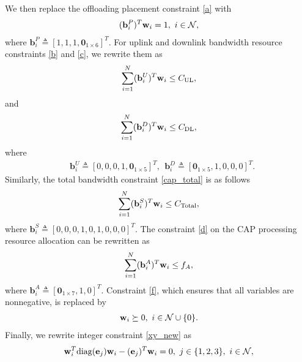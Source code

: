 \documentclass[10pt,journal,compsoc]{IEEEtran}
\begin{document}
We then replace the offloading placement constraint \eqref{a} with
\begin{align}
({\mathbf{b}^P_{i}})^T\mathbf{w}_i= 1,\
i\in\mathcal{N},\label{problem_QCQP.c}\allowdisplaybreaks
\end{align}
where $ \mathbf{b}^P_i\triangleq[1,1,1, \mathbf{0}_{1\times 6}]^T. $
For uplink and downlink bandwidth resource constraints \eqref{b} and
\eqref{c}, we rewrite them as
\begin{align}
\sum_{i=1}^N({\mathbf{b}^U_{i}})^T\mathbf{w}_i\leq
C_{\mathrm{UL}},\label{problem_QCQP.d}\allowdisplaybreaks
\end{align}
and
\begin{align}
\sum_{i=1}^N({\mathbf{b}^D_{i}})^T\mathbf{w}_i\leq
C_{\mathrm{DL}},\label{problem_QCQP.e}\allowdisplaybreaks
\end{align}
where
\begin{align}
&\mathbf{b}^{U}_i\triangleq[0,0,0,1, \mathbf{0}_{1\times
5}]^T,\ \ \mathbf{b}^{D}_i\triangleq[\mathbf{0}_{1\times
5},1,0,0,0]^T.\nonumber
\end{align}
Similarly, the total bandwidth constraint \eqref{cap_total} is as
follows
\begin{align}
\sum_{i=1}^N({\mathbf{b}^{S}_{i}})^T\mathbf{w}_i\leq
C_{\mathrm{Total}},\label{problem_QCQP.total}\allowdisplaybreaks
\end{align}
where
$\mathbf{b}^{S}_i\triangleq[0,0,0,1,0,1,0,0,0]^T.$
The constraint \eqref{d} on the CAP processing resource allocation
can be rewritten as
\begin{align}
\sum_{i=1}^N({\mathbf{b}^A_{i}})^T\mathbf{w}_i\leq
f_A,\label{problem_QCQP.f}\allowdisplaybreaks
\end{align}
where $ \mathbf{b}^{A}_i\triangleq[\mathbf{0}_{1\times 7},1,0]^T. $
Constraint \eqref{f}, which ensures that all variables are
nonnegative, is replaced by
\begin{align}
\mathbf{w}_i \succeq 0,\
i\in\mathcal{N}\cup\{0\}.\label{problem_QCQP.h}\allowdisplaybreaks
\end{align}
Finally, we rewrite integer constraint \eqref{xy_new} as
\begin{align}
\mathbf{w}_i^T\textrm{diag}(\mathbf{e}_j)\mathbf{w}_i-(\mathbf{e}_j)^T\mathbf{w}_i=0,
\ j \in \{1, 2, 3\},\
i\in\mathcal{N},\label{problem_QCQP.g}\allowdisplaybreaks
\end{align}
\end{document}
